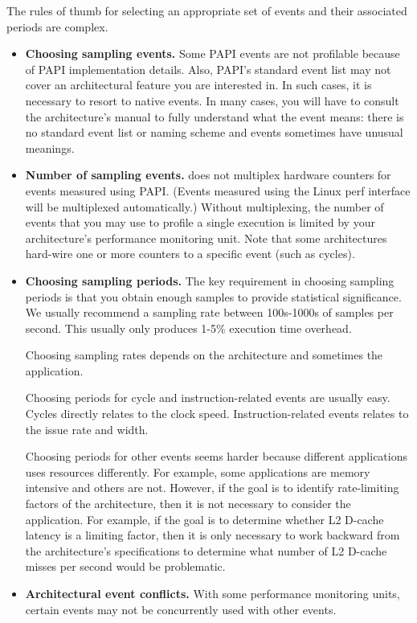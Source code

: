 \documentclass[english]{article}
\begin{document}
The rules of thumb for selecting an appropriate set of events and their associated periods are complex.
\begin{itemize}

\item \textbf{Choosing sampling events.}
Some PAPI events are not profilable because of PAPI implementation details.
Also, PAPI's standard event list may not cover an architectural feature you are interested in.
In such cases, it is necessary to resort to native events.
In many cases, you will have to consult the architecture's manual to fully understand what the event means: there is no standard event list or naming scheme and events sometimes have unusual meanings.

\item \textbf{Number of sampling events.}
 does not multiplex hardware counters for events measured using PAPI. (Events measured using the Linux
perf interface will be multiplexed automatically.)
Without multiplexing, the number of events that you may use to profile a single execution 
is limited by your architecture's performance monitoring unit.
Note that some architectures hard-wire one or more counters to a specific event (such as cycles).

\item \textbf{Choosing sampling periods.}
The key requirement in choosing sampling periods is that you obtain enough samples to provide statistical significance.
We usually recommend a sampling rate between 100s-1000s of samples per second.
This usually only produces 1-5\% execution time overhead.

Choosing sampling rates depends on the architecture and sometimes the application.

Choosing periods for cycle and instruction-related events are usually easy.
Cycles directly relates to the clock speed.
Instruction-related events relates to the issue rate and width.

Choosing periods for other events seems harder because different applications uses resources differently.
For example, some applications are memory intensive and others are not.
However, if the goal is to identify rate-limiting factors of the architecture, then it is not necessary to consider the application.
For example, if the goal is to determine whether L2 D-cache latency is a limiting factor, then it is only necessary to work backward from the architecture's specifications to determine what number of L2 D-cache misses per second would be problematic.

\item \textbf{Architectural event conflicts.}
With some performance monitoring units, certain events may not be concurrently used with other events.
\end{itemize}
\end{document}
